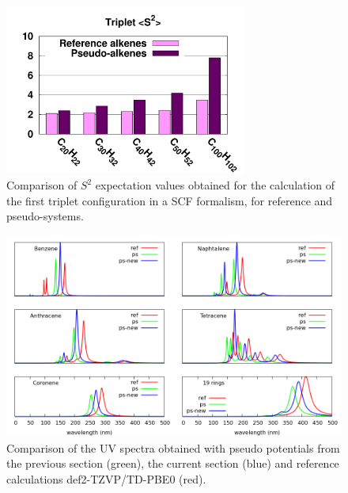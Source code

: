 \documentclass[12pt]{article}
\begin{document}
\begin{figure}
\begin{center}
\includegraphics[width=8cm]{long_pbe0_s2}
\end{center}
\vspace{0.25in}
\hspace*{3in}
\caption{Comparison of $S^2$ expectation values obtained for the calculation
of the first triplet configuration in a SCF formalism, for reference
and pseudo-systems.}
\label{fig:ssquare}
\end{figure}

\begin{figure}
\begin{center}
\includegraphics[width=\textwidth]{cnhn_uv}
\end{center}
\vspace{0.25in}
\hspace*{3in}
\caption{Comparison of the UV spectra obtained with pseudo potentials from the previous section (green), the current section (blue) and reference calculations def2-TZVP/TD-PBE0 (red).}
\label{fig:cnhn_uv}
\end{figure}
\end{document}
